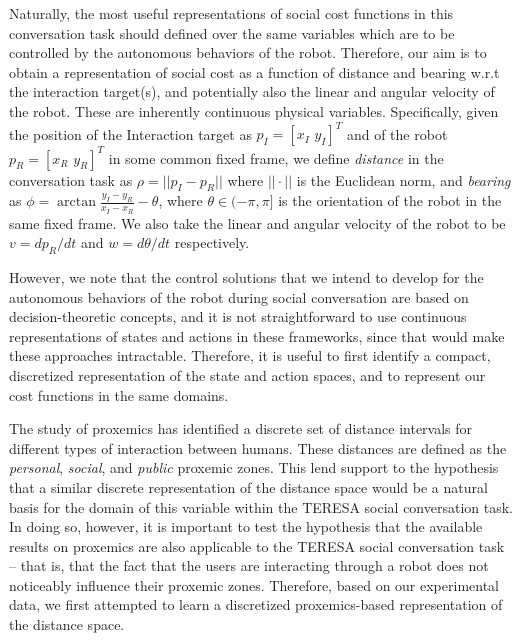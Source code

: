 \documentclass[a4paper,11pt]{report}
\begin{document}
Naturally, the most useful representations of social cost functions in this conversation task should defined over the same variables which are to be controlled by the autonomous behaviors of the robot. Therefore, our aim is to obtain a representation of social cost as a function of distance and bearing w.r.t the interaction target(s), and potentially also the linear and angular velocity of the robot. These are inherently continuous physical variables. Specifically, given the position of the Interaction target as $p_I = [x_I\,\,y_I]^T$ and of the robot $p_R = [x_R\,\,y_R]^T$ in some common fixed frame, we define \emph{distance} in the conversation task as $\rho = ||p_I - p_R||$ where $||\cdot||$ is the Euclidean norm, and \emph{bearing} as $\phi = \arctan \frac{y_I - y_R}{x_I - x_R} - \theta$, where $\theta\in(-\pi,\pi]$ is the orientation of the robot in the same fixed frame. We also take the linear and angular velocity of the robot to be $v = dp_R/dt$ and $w = d\theta/dt$ respectively.

However, we note that the control solutions that we intend to develop for the autonomous behaviors of the robot during social conversation are based on decision-theoretic concepts, and it is not straightforward to use continuous representations of states and actions in these frameworks, since that would make these approaches intractable. Therefore, it is useful to first identify a compact, discretized representation of the state and action spaces, and to represent our cost functions in the same domains.

The study of proxemics \cite{hall1966hidden} has identified a discrete set of distance intervals for different types of interaction between humans. These distances are defined as the \emph{personal}, \emph{social}, and \emph{public} proxemic zones. This lend support to the hypothesis that a similar discrete representation of the distance space would be a natural basis for the domain of this variable within the TERESA social conversation task. In doing so, however, it is important to test the hypothesis that the available results on proxemics are also applicable to the TERESA social conversation task -- that is, that the fact that the users are interacting through a robot does not noticeably influence their proxemic zones. Therefore, based on our experimental data, we first attempted to learn a discretized proxemics-based representation of the distance space.
\end{document}
